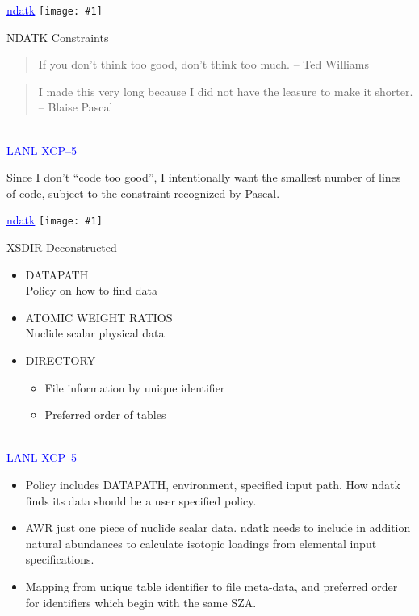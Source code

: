 \documentclass[clock]{slides}
\newenvironment{xslide}[1][logo.jpg]{\begin{slide} \tiny
\textcolor{blue}{\underline{ndatk}} \hfill
\texttt{[image: \#1]}
\normalsize}{\vfill\tiny
\textcolor{blue}{\hrulefill \\LANL XCP--5}
\end{slide}}
\begin{document}
\begin{xslide}
\begin{center}\Large
NDATK Constraints
\end{center}
\begin{quote}
If you don't think too good, don't think too much.
\flushright -- Ted Williams
\end{quote}

\begin{quote}
I made this very long because I did not have the leasure to make it
shorter.
\flushright -- Blaise Pascal
\end{quote}
\end{xslide}

\begin{note}\small
Since I don't ``code too good'', I intentionally want the smallest
number of lines of code, subject to the constraint recognized by
Pascal.
\end{note}

\begin{xslide}
\begin{center}\Large
XSDIR Deconstructed
\end{center}

\begin{itemize}
\item DATAPATH\\
  Policy on how to find data
\item ATOMIC WEIGHT RATIOS\\
  Nuclide scalar physical data
\item DIRECTORY\\
\begin{itemize}
\item File information by unique identifier
\item Preferred order of tables
\end{itemize}
\end{itemize}
\end{xslide}

\begin{note}\small
\begin{itemize}
\item Policy includes DATAPATH, environment, specified input path.
  How ndatk finds its data should be a user specified policy.
\item AWR just one piece of nuclide scalar data.  ndatk needs to
  include in addition natural abundances to calculate isotopic
  loadings from elemental input specifications.
\item Mapping from unique table identifier to file meta-data, and
  preferred order for identifiers which begin with the same SZA.
\end{itemize}
\end{note}
\end{document}

